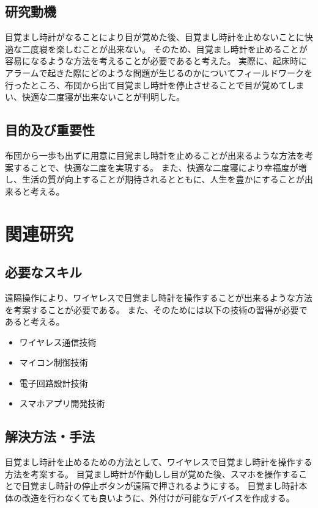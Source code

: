 \section{研究動機}
目覚まし時計がなることにより目が覚めた後、目覚まし時計を止めないことに快適な二度寝を楽しむことが出来ない。
そのため、目覚まし時計を止めることが容易になるような方法を考えることが必要であると考えた。
実際に、起床時にアラームで起きた際にどのような問題が生じるのかについてフィールドワークを行ったところ、布団から出て目覚まし時計を停止させることで目が覚めてしまい、快適な二度寝が出来ないことが判明した。

\section{目的及び重要性}
布団から一歩も出ずに用意に目覚まし時計を止めることが出来るような方法を考案することで、快適な二度を実現する。
また、快適な二度寝により幸福度が増し、生活の質が向上することが期待されるとともに、人生を豊かにすることが出来ると考える。

\chapter{関連研究}
\section{必要なスキル}
遠隔操作により、ワイヤレスで目覚まし時計を操作することが出来るような方法を考案することが必要である。
また、そのためには以下の技術の習得が必要であると考える。
\begin{itemize}
    \item ワイヤレス通信技術
    \item マイコン制御技術
    \item 電子回路設計技術
    \item スマホアプリ開発技術
\end{itemize}

\section{解決方法・手法}
目覚まし時計を止めるための方法として、ワイヤレスで目覚まし時計を操作する方法を考案する。
目覚まし時計が作動しし目が覚めた後、スマホを操作することで目覚まし時計の停止ボタンが遠隔で押されるようにする。
目覚まし時計本体の改造を行わなくても良いように、外付けが可能なデバイスを作成する。

